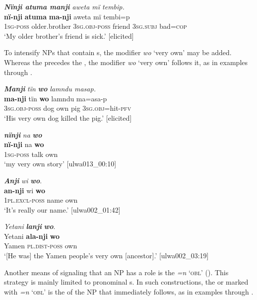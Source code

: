 \ea%
    \label{ex:phrase:12}
          \textit{\textbf{Nïnji atuma manji} aweta mï tembip.}\\
\gll    \textbf{nï-nji}    \textbf{atuma}      \textbf{ma-nji}      aweta  mï      tembi=p\\
    1\textsc{sg-poss}  older.brother  3\textsc{sg.obj-poss}  friend  3\textsc{sg.subj}  bad=\textsc{cop}\\
\glt `My older brother’s friend is sick.’ [elicited]
\z

 To intensify  NPs that contain s, the modifier \textit{wo} ‘very own’ may be added. Whereas the  precedes the , the  modifier \textit{wo} ‘very own’ follows it, as in examples  through .

\ea%
    \label{ex:phrase:13}
            \textbf{\textit{Manji}} \textit{tïn} \textbf{\textit{wo}} \textit{lamndu masap.}\\
\gll \textbf{ma-nji}      tïn    \textbf{wo}    lamndu  ma=asa-p\\
    3\textsc{sg.obj-poss}  dog  own  pig      3\textsc{sg.obj}=hit-\textsc{pfv}\\
\glt `His very own dog killed the pig.’ [elicited]
\z

\ea%
    \label{ex:phrase:14}
          \textbf{\textit{nïnji}} \textit{na} \textbf{\textit{wo}}\\
\gll    \textbf{nï-nji}    na    \textbf{wo}\\
    1\textsc{sg-poss}  talk  own\\
\glt `my very own story’ [ulwa013\_00:10]
\z

\ea%
    \label{ex:phrase:15}
          \textbf{\textit{Anji}} \textit{wi} \textbf{\textit{wo}}.\\
\gll \textbf{an-nji}        wi    \textbf{wo}\\
    1\textsc{pl.excl-poss}  name  own\\
\glt `It’s really our name.’ [ulwa002\_01:42]
\z

\ea%
    \label{ex:phrase:16}
          \textit{Yetani} \textbf{\textit{lanji}} \textbf{\textit{wo}}.\\
\gll Yetani  \textbf{ala-nji}      \textbf{wo}\\
    Yamen  \textsc{pl.dist-poss}  own\\
\glt `[He was] the Yamen people’s very own [ancestor].’ [ulwa002\_03:19]
\z

Another means of signaling that an NP has a  role is the   \textit{=n} \textsc{‘obl'} (). This strategy is mainly limited to pronominal s. In such constructions, the  or  marked with \textit{=n} \textsc{‘obl'} is the  of the NP that immediately follows, as in examples  through .

